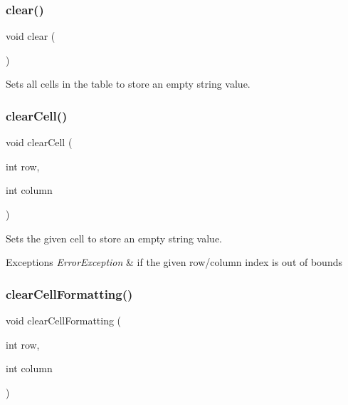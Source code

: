 \mbox{\label{classsgl_1_1GTable_ac8bb3912a3ce86b15842e79d0b421204}} 
\subsubsection{\texorpdfstring{clear()}{clear()}}
{\footnotesize\ttfamily void clear (\begin{DoxyParamCaption}{ }\end{DoxyParamCaption})\hspace{0.3cm}{\ttfamily [virtual]}}



Sets all cells in the table to store an empty string value. 

\mbox{\label{classsgl_1_1GTable_ab7bffbf52806e438ac155886079d9bf6}} 
\subsubsection{\texorpdfstring{clear\+Cell()}{clearCell()}}
{\footnotesize\ttfamily void clear\+Cell (\begin{DoxyParamCaption}\item[{int}]{row,  }\item[{int}]{column }\end{DoxyParamCaption})\hspace{0.3cm}{\ttfamily [virtual]}}



Sets the given cell to store an empty string value. 


\begin{DoxyExceptions}{Exceptions}
{\em Error\+Exception} & if the given row/column index is out of bounds \\
\hline
\end{DoxyExceptions}
\mbox{\label{classsgl_1_1GTable_a5ba4fe558e9d315c123ecd9e896065ca}} 
\subsubsection{\texorpdfstring{clear\+Cell\+Formatting()}{clearCellFormatting()}}
{\footnotesize\ttfamily void clear\+Cell\+Formatting (\begin{DoxyParamCaption}\item[{int}]{row,  }\item[{int}]{column }\end{DoxyParamCaption})\hspace{0.3cm}{\ttfamily [virtual]}}



